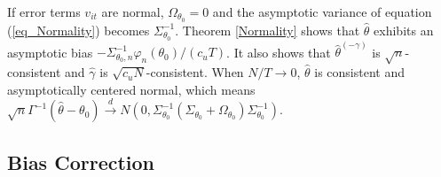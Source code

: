 \documentclass[11pt,a4paper]{article}
\begin{document}
If error terms $v_{it}$ are normal, $\Omega_{\theta_0}=0$ and the asymptotic variance of equation (\ref{eq_Normality}) becomes $\Sigma_{\theta_0}^{-1}$.
Theorem \ref{Normality} shows that $\hat{\theta}$ exhibits an asymptotic bias $-\Sigma_{\theta_0,n}^{-1}\varphi_n(\theta_0)/(c_uT)$. It also shows that $\hat{\theta}^{(-\gamma)}$ is $\sqrt{n}$-consistent and $\hat{\gamma}$ is $\sqrt{c_uN}$-consistent.
When $N/T\rightarrow0$, $\hat{\theta}$ is consistent and asymptotically centered normal, which means
$\sqrt{n}\Gamma^{-1}\left(\hat{\theta}-\theta_0\right)\overset{d}{\rightarrow}N\left(0,\Sigma_{\theta_0}^{-1}(\Sigma_{\theta_0}+\Omega_{\theta_0})\Sigma_{\theta_0}^{-1}\right)$.


\subsection{Bias Correction}
\end{document}
